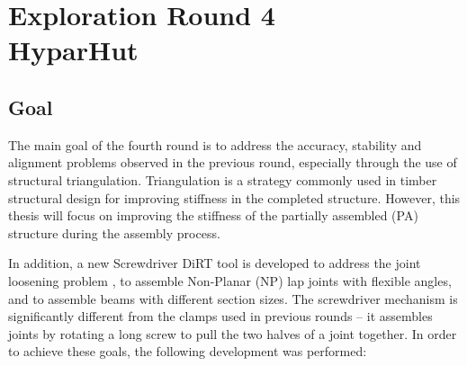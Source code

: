 \chapter[Exploration Round 4 - HyparHut]{Exploration Round 4\\HyparHut}
\label{chapter:exploration-round-4}

\section{Goal}
\label{section:exploration-4-goal}

The main goal of the fourth round is to address the accuracy, stability and alignment problems observed in the previous round, especially through the use of structural triangulation. Triangulation is a strategy commonly used in timber structural design for improving stiffness in the completed structure. However, this thesis will focus on improving the stiffness of the partially assembled (PA) structure during the assembly process. 

In addition, a new Screwdriver DiRT tool is developed to address the joint loosening problem , to assemble Non-Planar (NP) lap joints with flexible angles, and to assemble beams with different section sizes. The screwdriver mechanism is significantly different from the clamps used in previous rounds -- it assembles joints by rotating a long screw to pull the two halves of a joint together. In order to achieve these goals, the following development was performed:

